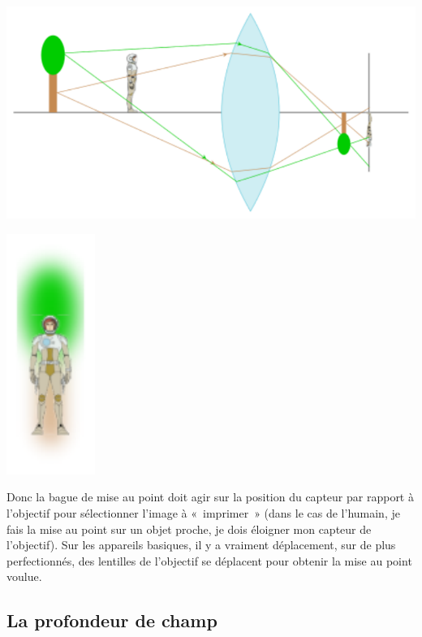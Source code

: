 \documentclass[../../main/main.tex]{subfiles}
\begin{document}
\begin{minipage}[c]{0.53\linewidth}
	\begin{center}
		\includegraphics[width=\linewidth]{mise_pt-b}
	\end{center}
\end{minipage}
\hfill
\begin{minipage}[c]{0.45\linewidth}
	\begin{center}
		\includegraphics[scale=.8]{mise_pt-res}
	\end{center}
\end{minipage}

Donc la bague de mise au point doit agir sur la position du capteur par rapport
à l'objectif pour sélectionner l'image à «~imprimer~» (dans le cas de l'humain,
je fais la mise au point sur un objet proche, je dois éloigner mon capteur de
l'objectif). Sur les appareils basiques, il y a vraiment déplacement, sur de
plus perfectionnés, des lentilles de l'objectif se déplacent pour obtenir la
mise au point voulue.

\subsection{La profondeur de champ}
\end{document}
